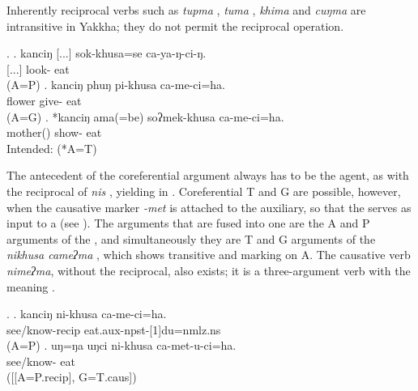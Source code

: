 Inherently reciprocal verbs such as \emph{tupma} , \emph{tuma} , \emph{khima}  and \emph{cuŋma}  are intransitive in Yakkha; they do not permit the reciprocal operation. 
 

\ex. \ag. kanciŋ [...] sok-khusa=se ca-ya-ŋ-ci-ŋ.\\
  [...] look- eat\\
 (A=P) 
\bg. kanciŋ phuŋ pi-khusa ca-me-ci=ha.\\
 flower give- eat\\
 (A=G)
\bg. *kanciŋ ama(=be) soʔmek-khusa ca-me-ci=ha.\\
 mother() show- eat\\
Intended:  (*A=T)


The antecedent of the coreferential argument always has to be the agent, as with the reciprocal of \emph{nis} , yielding  in \Next[a]. Coreferential T and G are possible, however, when the causative marker \emph{-met} is attached to the auxiliary, so that the  serves as input to a  (see \Next[b]). The arguments that are fused into one  are the A and P arguments of the , and simultaneously they are T and G arguments of the  \emph{nikhusa cameʔma} , which shows transitive  and   marking on A. The causative verb \emph{nimeʔma}, without the reciprocal, also exists; it is a three-argument verb with the meaning  .

\ex. \ag. kanciŋ ni-khusa  ca-me-ci=ha.\\
			   see/know-{\sc recip}  eat{\sc .aux-npst-[1]du=nmlz.ns}\\
			 (A=P)
	\bg. uŋ=ŋa uŋci ni-khusa ca-met-u-ci=ha.\\
	  see/know- eat\\
	 ([[A=P.{\sc recip}], G=T.{\sc caus}])	
	

